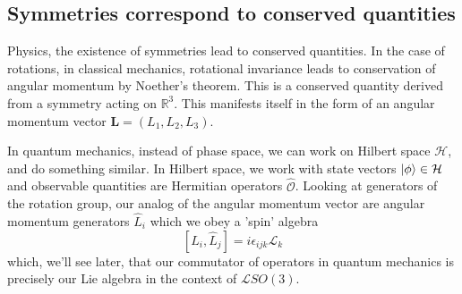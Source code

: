 \subsection{Symmetries correspond to conserved quantities}  
Physics, the existence of symmetries lead to conserved quantities. In the case of rotations, in classical mechanics, rotational invariance leads to conservation of angular momentum by Noether's theorem. This is a conserved quantity derived from a symmetry acting on $\mathbb{R}^3 $. This manifests itself in the form of an angular momentum vector $\mathbf{L }  = (L_1, L_2, L_3 )$.  

In quantum mechanics, instead of phase space, we can work on Hilbert space $\mathcal{H}$, and do something similar. In Hilbert space, we work with state vectors $\ket{ \phi} \in \mathcal{H}$ and observable quantities are Hermitian operators $\hat{ \mathcal{ O }} $. Looking at generators of the rotation group, our analog of the angular momentum vector are angular momentum generators $\hat{ L}_i$ which we obey a 'spin' algebra 
\[
	 [\hat{L}_i, \hat{L}_j ] = i \epsilon_{ ijk} \mathcal{L}_k
\] 
which, we'll see later, that our commutator of operators in quantum mechanics is precisely our Lie algebra in the context of $\mathcal{ L }SO( 3)$. 

\pagebreak
  
